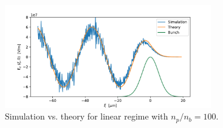 







\begin{figure}
\centering
\includegraphics[width=0.8\textwidth]{longitudinal_theory_vs_simulation.pdf}
\caption{Simulation vs. theory for linear regime with $n_p/n_b=100$. }
\label{theory_vs_simulation}
\end{figure}
\clearpage
